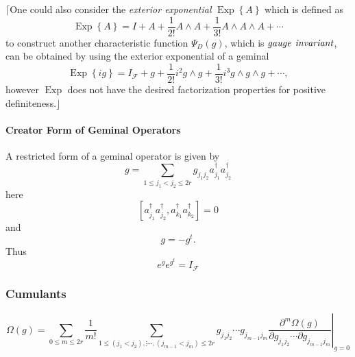 \documentclass[aps,preprint]{revtex4}%
\begin{document}
$\lceil$One could also consider the\emph{ exterior exponential }%
$\operatorname{Exp}\left\{  A\right\}  $ which is defined as
\begin{equation}
\operatorname{Exp}\left\{  A\right\}  =I+A+\frac{1}{2!}A\wedge A+\frac{1}%
{3!}A\wedge A\wedge A+\cdots
\end{equation}
to construct another characteristic function $\Psi_{D}\left(  g\right)  $,
which is $\emph{gauge}$ $\emph{invariant}$, can be obtained by using the
exterior exponential of a geminal
\begin{equation}
\operatorname{Exp}\left\{  ig\right\}  =I_{\mathcal{F}}+g+\frac{1}{2!}%
i^{2}g\wedge g+\frac{1}{3!}i^{3}g\wedge g\wedge g+\cdots,
\end{equation}
however $\operatorname{Exp}$ does not have the desired factorization
properties for positive definiteness.$\rfloor$

\paragraph{Creator Form of Geminal Operators}

A restricted form of a geminal operator is given by
\begin{equation}
g=%
{\textstyle\sum\limits_{1\leq j_{1}<j_{2}\leq2r}}
\mathit{g}_{j_{1}j_{2}}a_{j_{1}}^{\dagger}a_{j_{2}}^{\dagger}%
\end{equation}
here
\begin{equation}
\left[  a_{j_{1}}^{\dagger}a_{j_{2}}^{\dagger},a_{k_{1}}^{\dagger}a_{k_{2}%
}^{\dagger}\right]  =0
\end{equation}
and
\begin{equation}
g=-g^{t}.
\end{equation}
Thus
\begin{equation}
e^{g}e^{g^{t}}=I_{\mathcal{F}}%
\end{equation}


\subsubsection{Cumulants}%

\begin{equation}
\Omega\left(  g\right)  =\sum_{0\leq m\leq2r}\frac{1}{m!}%
{\textstyle\sum\limits_{1\leq\left(  j_{1}<j_{2}\right)  ,\vdots\cdots,\left(
j_{m-1}<j_{m}\right)  \leq2r}}
\mathit{g}_{j_{1}j_{2}}\cdots\mathit{g}_{j_{m-1}j_{m}}\left.  \frac
{\partial^{m}\Omega\left(  g\right)  }{\partial\mathit{g}_{j_{1}j_{2}}%
\cdots\partial\mathit{g}_{j_{m-1}j_{m}}}\right\vert _{g=0}%
\end{equation}
%
\end{document}
